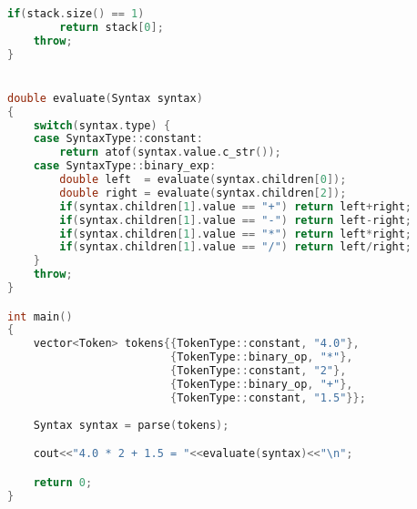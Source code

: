 \documentclass{scrartcl}
\begin{document}
{\begin{lstlisting}[language=C++]
    if(stack.size() == 1)
        return stack[0];
    throw;
}


double evaluate(Syntax syntax)
{
    switch(syntax.type) {
    case SyntaxType::constant:
        return atof(syntax.value.c_str());
    case SyntaxType::binary_exp:
        double left  = evaluate(syntax.children[0]);
        double right = evaluate(syntax.children[2]);
        if(syntax.children[1].value == "+") return left+right;
        if(syntax.children[1].value == "-") return left-right;
        if(syntax.children[1].value == "*") return left*right;
        if(syntax.children[1].value == "/") return left/right;
    }
	throw;
}

int main()
{
    vector<Token> tokens{{TokenType::constant, "4.0"},
                         {TokenType::binary_op, "*"},
                         {TokenType::constant, "2"},
                         {TokenType::binary_op, "+"},
                         {TokenType::constant, "1.5"}};
  
    Syntax syntax = parse(tokens);

    cout<<"4.0 * 2 + 1.5 = "<<evaluate(syntax)<<"\n";

    return 0;
}

\end{lstlisting}}
\end{document}
